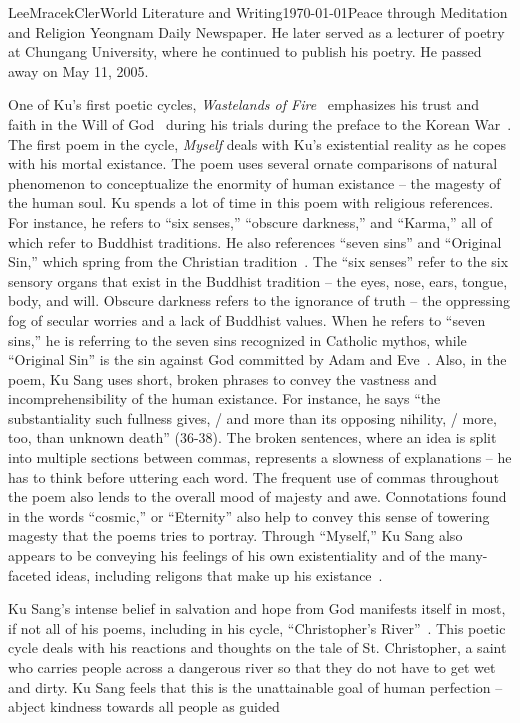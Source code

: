 \documentclass[12pt,letterpaper]{article}
\begin{document}
\begin{mla}{Lee}{Mracek}{Cler}{World Literature and Writing}{\today}{Peace through Meditation and Religion}
    Yeongnam Daily Newspaper. He later served as a lecturer of poetry at Chungang University, where he continued to publish his poetry. He passed away on May 11, 2005.~\parencite{lti} \\
    One of Ku's first poetic cycles, \textit{Wastelands of Fire}~\parencite{koreanlit} emphasizes his trust and faith in the Will of God~\parencite{bong-goon} during his trials during the preface to the Korean War~\parencite{diego}. The first poem in the cycle, \textit{Myself} deals with Ku's existential reality as he copes with his mortal existance. The poem uses several ornate comparisons of natural phenomenon to conceptualize the enormity of human existance -- the magesty
    of the human soul. Ku spends a lot of time in this poem with religious references. For instance, he refers to ``six senses,'' ``obscure darkness,'' and ``Karma,'' all of which refer to Buddhist traditions. He also references ``seven sins'' and ``Original Sin,'' which spring from the Christian tradition~\parencite{bong-goon}. The ``six senses'' refer to the six sensory organs that exist in the Buddhist tradition -- the eyes, nose, ears, tongue, body, and will. Obscure
    darkness refers to the ignorance of truth -- the oppressing fog of secular worries and a lack of Buddhist values. When he refers to ``seven sins,'' he is referring to the seven sins recognized in Catholic mythos, while ``Original Sin'' is the sin against God committed by Adam and Eve~\parencite{bong-goon}. Also, in the poem, Ku Sang uses short, broken phrases to convey the vastness and incomprehensibility of the human existance. For instance, he says ``the substantiality such fullness gives, / and more
    than its opposing nihility, / more, too, than unknown death'' (36-38). The broken sentences, where an idea is split into multiple sections between commas, represents a slowness of explanations -- he has to think before uttering each word. The frequent use of commas throughout the poem also lends to the overall mood of majesty and awe. Connotations found in the words ``cosmic,'' or ``Eternity'' also help to convey this sense of towering magesty that the poems tries to
    portray. Through ``Myself,'' Ku Sang also appears to be conveying his feelings of his own existentiality and of the many-faceted ideas, including religons that make up his existance~\parencite{lti}.\\ 
    Ku Sang's intense belief in salvation and hope from God manifests itself in most, if not all of his poems, including in his cycle, ``Christopher's River''~\parencite{bong-goon}. This poetic cycle deals with his reactions and thoughts on the tale of St. Christopher, a saint who carries people across a dangerous river so that they do not have to get wet and dirty. Ku Sang feels that this is the unattainable goal of human perfection -- abject kindness towards all people as guided

\end{mla}
\end{document}
